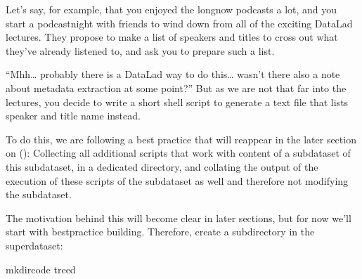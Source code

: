 \sphinxAtStartPar
Let’s say, for example, that you enjoyed the longnow podcasts a lot,
and you start a podcast\sphinxhyphen{}night with friends to wind down from all of
the exciting DataLad lectures. They propose to make a
list of speakers and titles to cross out what they’ve already listened
to, and ask you to prepare such a list.

\sphinxAtStartPar
“Mhh… probably there is a DataLad way to do this… wasn’t there also
a note about metadata extraction at some point?” But as we are not that
far into the lectures, you decide to write a short shell script
to generate a text file that lists speaker and title
name instead.

\sphinxAtStartPar
To do this, we are following a best practice that will reappear in the
later section on {\hyperref[\detokenize{basics/101-127-yoda:yoda}]{}} (): Collecting all
additional scripts that work with content of a subdataset 
of this subdataset, in a dedicated  directory,
and collating the output of the execution of these scripts
 of the subdataset as well \textendash{} and
therefore not modifying the subdataset.

\sphinxAtStartPar
The motivation behind this will become clear in later sections,
but for now we’ll start with best\sphinxhyphen{}practice building.
Therefore, create a subdirectory  in the 
superdataset:

\begin{sphinxVerbatim}[commandchars=\\\{\}]
mkdircode
tree\PYGZhy{}d

\end{sphinxVerbatim}

